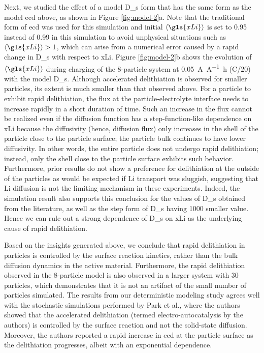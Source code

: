 \documentclass{article}
\begin{document}
Next, we studied the effect of a model \gls{D_s} form that has the
same form as the model \gls{ecd} above, as shown in Figure
\ref{fig:model-2}a. Note that the traditional form of \gls{ecd} was
used for this simulation and initial $\left\langle \gls{xLi}
\right\rangle$ is set to \num{0.95} instead of \num{0.99} in this
simulation to avoid unphysical situations such as $\left\langle
\gls{xLi} \right\rangle > 1$, which can arise from a numerical error
caused by a rapid change in \gls{D_s} with respect to
\gls{xLi}. Figure \ref{fig:model-2}b shows the evolution of
$\left\langle \gls{xLi} \right\rangle$ during charging of the
8-particle system at \SI{0.05}{\ampere\per\ampere\hour} (C/20) with
the model \gls{D_s}. Although accelerated delithiation is observed for
smaller particles, its extent is much smaller than that observed
above. For a particle to exhibit rapid delithiation, the flux at the
particle-electrolyte interface needs to increase rapidly in a short
duration of time. Such an increase in the flux cannot be realized even
if the diffusion function has a step-function-like dependence on
\gls{xLi} because the diffusivity (hence, diffusion flux) only
increases in the shell of the particle close to the particle surface;
the particle bulk continues to have lower diffusivity. In other words,
the entire particle does not undergo rapid delithiation; instead, only
the shell close to the particle surface exhibits such
behavior. Furthermore, prior results do not show a preference for
delithiation at the outside of the particles\cite{lu2021} as would be
expected if Li transport was sluggish, suggesting that Li diffusion is
not the limiting mechanism in these experiments. Indeed, the
simulation result also supports this conclusion for the values of
\gls{D_s} obtained from the literature, as well as the step form of
\gls{D_s} having 1000 smaller value. Hence we can rule out a strong
dependence of \gls{D_s} on \gls{xLi} as the underlying cause of rapid
delithiation.

Based on the insights generated above, we conclude that rapid
delithiation in \nca{} particles is controlled by the surface reaction
kinetics, rather than the bulk  diffusion dynamics in the
active material. Furthermore, the rapid delithiation observed in the
8-particle model is also observed in a larger system with 30
particles, which demonstrates that it is not an artifact of the small
number of particles simulated. The results from our deterministic
modeling study agrees well with the stochastic simulations performed
by Park et al.\cite{chueh2021}, where the authors showed that the
accelerated delithiation (termed electro-autocatalysis by the authors)
is controlled by the surface reaction and not the solid-state
diffusion. Moreover, the authors reported a rapid increase in
\gls{ecd} at the \nca{} particle surface as the delithiation
progresses, albeit with an exponential dependence.
\end{document}

